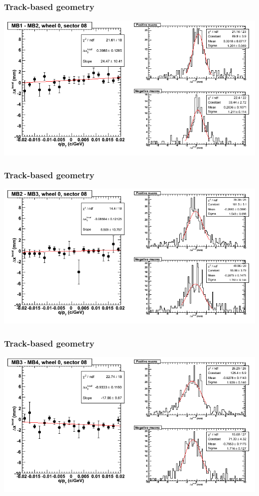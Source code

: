 \documentclass[compress]{beamer}
\begin{document}
\begin{frame}
\frametitle{Track-based geometry}
\includegraphics[width=\linewidth]{NOV4_segdiffs/dt13_resid_C_08_12.png}
\end{frame}

\begin{frame}
\frametitle{Track-based geometry}
\includegraphics[width=\linewidth]{NOV4_segdiffs/dt13_resid_C_08_23.png}
\end{frame}

\begin{frame}
\frametitle{Track-based geometry}
\includegraphics[width=\linewidth]{NOV4_segdiffs/dt13_resid_C_08_34.png}
\end{frame}
\end{document}
